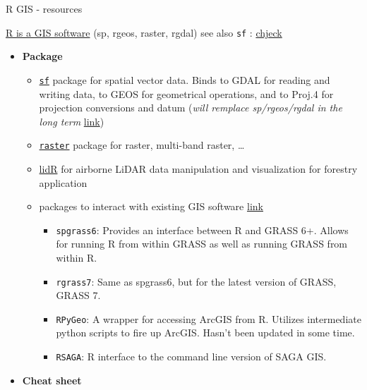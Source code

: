 \documentclass[9pt,ignorenonframetext,]{beamer}
\providecommand{\tightlist}{%
  \setlength{\itemsep}{0pt}\setlength{\parskip}{0pt}}
\begin{document}
\begin{frame}[fragile]{R GIS - resources}

\href{ftp://ftp.bgc-jena.mpg.de/pub/outgoing/mforkel/Rcourse/spatialR_2015.pdf}{R
is a GIS software} (sp, rgeos, raster, rgdal) see also \texttt{sf} :
\href{https://cran.r-project.org/web/packages/sf/vignettes/sf1.html}{chjeck}

\begin{itemize}
\tightlist
\item
  \textbf{Package}

  \begin{itemize}
  \tightlist
  \item
    \href{https://cran.r-project.org/web/packages/sf/index.html}{\texttt{sf}}
    package for spatial vector data. Binds to GDAL for reading and
    writing data, to GEOS for geometrical operations, and to Proj.4 for
    projection conversions and datum (\emph{will remplace sp/rgeos/rgdal
    in the long term}
    \href{https://github.com/r-spatial/sf/wiki/migrating}{link})
  \item
    \href{https://cran.r-project.org/web/packages/raster/index.html}{\texttt{raster}}
    package for raster, multi-band raster, \ldots{}
  \item
    \href{https://github.com/Jean-Romain/lidR}{lidR} for airborne LiDAR
    data manipulation and visualization for forestry application
  \item
    packages to interact with existing GIS software
    \href{http://jwhollister.com/r_landscape_tutorial/tutorial.html}{link}

    \begin{itemize}
    \tightlist
    \item
      \texttt{spgrass6}: Provides an interface between R and GRASS 6+.
      Allows for running R from within GRASS as well as running GRASS
      from within R.
    \item
      \texttt{rgrass7}: Same as spgrass6, but for the latest version of
      GRASS, GRASS 7.
    \item
      \texttt{RPyGeo}: A wrapper for accessing ArcGIS from R. Utilizes
      intermediate python scripts to fire up ArcGIS. Hasn't been updated
      in some time.
    \item
      \texttt{RSAGA}: R interface to the command line version of SAGA
      GIS.
    \end{itemize}
  \end{itemize}
\item
  \textbf{Cheat sheet}


\end{itemize}
\end{frame}
\end{document}

